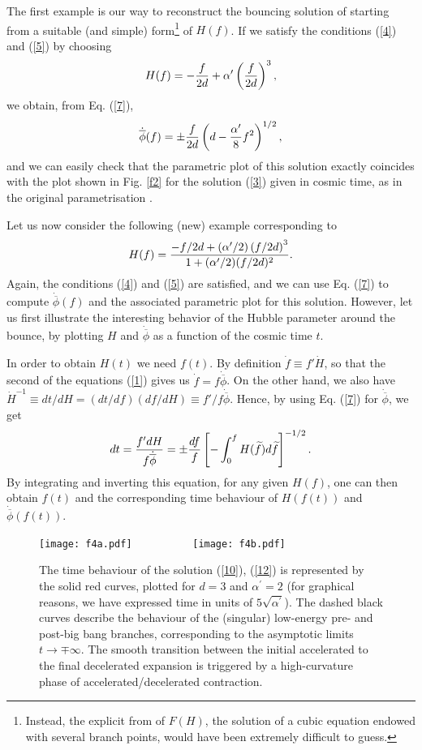\documentclass[a4paper,11pt]{article}
\def\beq{\begin{equation}}
\def\eeq{\end{equation}}
\def \ra {\rightarrow}
\def \ti {\widetilde}
\def \ap {\alpha^{\prime}}
\def \fb {\overline \phi}
\def \fbp {\dot{\fb}}
\begin{document}
The first example is our way to reconstruct the bouncing solution of \cite{2} starting from a suitable (and simple) form\footnote{Instead, the explicit from of $F(H)$, the solution of a cubic equation endowed with several branch points, would have been extremely difficult to guess.} of 
 $H(f)$. If we satisfy the conditions (\ref{4}) and (\ref{5}) by choosing
\beq
H(f)= -{f\over 2d} + \ap \left(f\over 2d\right)^3,
\label{8}
\eeq
we obtain, from Eq. (\ref{7}),
\beq
\fbp(f) = \pm {f\over 2d} \left( d- {\ap\over 8} f^2\right)^{1/2},
\label{9}
\eeq
and we can easily check that the parametric plot of this solution exactly coincides with the plot shown in Fig. \ref{f2} for the solution (\ref{3})  given in cosmic time, as in the original parametrisation \cite{2}. 

Let us now consider the following (new) example corresponding to
\beq
H(f)={ -{f/2d} + (\ap/2)\left(f/ 2d\right)^3\over 1+ (\ap/2)(f/2d)^2}.
\label{10}
\eeq
Again, the conditions (\ref{4}) and (\ref{5}) are satisfied, and we can use Eq. (\ref{7}) to compute $\fbp(f)$ and the associated parametric plot for this solution. However, let us first illustrate the interesting behavior of the Hubble parameter around the bounce, by plotting $H$ and $\fbp$ as a function of the cosmic time  $t$. 

In order to obtain $H(t)$ we need $f(t)$. By definition $\dot f \equiv f' \dot H$, so that  the second of the equations (\ref{1}) gives us $\dot f = f \fbp$. On the other hand, we also have $\dot H^{-1} \equiv dt/dH= (dt/df)(df/dH)\equiv f'/f \fbp$. 
Hence, by using Eq. (\ref{7}) for $\fbp$, we get
\beq
dt={f'dH\over f \fbp}= \pm {df\over f}  \left[ -\int_0^f H(\ti f) d \ti f  \right]^{-1/2}.
\label{11}
\eeq
By integrating and inverting this equation, for any given $H(f)$, one can then obtain $f(t)$ and the corresponding time behaviour of $H(f(t))$ and $\fbp(f(t))$. 


\begin{figure}[t]
\centering
\texttt{[image: f4a.pdf]}~~~~~~~~~~
\texttt{[image: f4b.pdf]}
\caption{The time behaviour of the solution (\ref{10}),  (\ref{12}) is represented by the solid red curves, plotted for $d=3$ and $\ap=2$ (for graphical reasons, we have expressed time in units of $5 \sqrt{\ap}$). The dashed black curves describe the behaviour of the (singular) low-energy pre- and post-big bang branches, corresponding to the asymptotic limits $t \ra \mp \infty$.
The smooth transition between the initial accelerated to the final decelerated expansion is triggered by a high-curvature phase of accelerated/decelerated contraction.}
\label{f4}
\end{figure}
\end{document}
